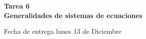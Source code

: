 \documentclass[12pt]{exam}
\begin{document}
\centering


\Large 
\textbf{\huge Tarea 6 \\ \large Generalidades de sistemas de ecuaciones}

\small
Fecha de entrega lunes 13 de Diciembre
\vskip10pt

\normalsize

\pointformat{\bfseries\boldmath(\thepoints)}
\vskip10pt
\end{document}
